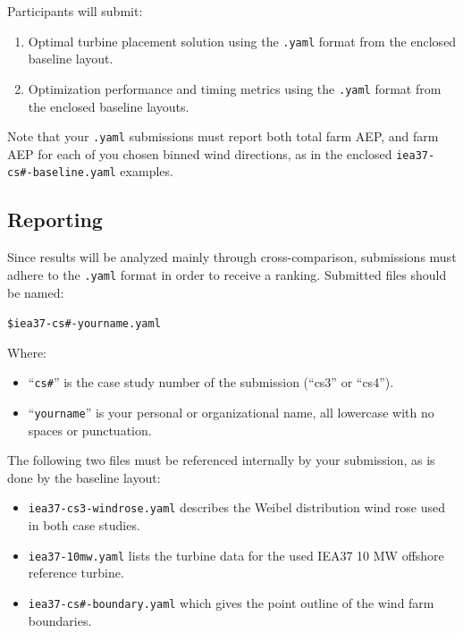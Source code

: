 \documentclass[10pt]{article}
\begin{document}
    Participants will submit:
    \begin{enumerate}
        \item Optimal turbine placement solution using the \texttt{.yaml} format from the enclosed baseline layout. 
        \item Optimization performance and timing metrics using the \texttt{.yaml} format from the enclosed baseline layouts.
    \end{enumerate}

    Note that your \texttt{.yaml} submissions must report both total farm AEP, and farm AEP for each of you chosen binned wind directions, as in the enclosed \texttt{iea37-cs\#-baseline.yaml} examples.

    \subsection{Reporting}

        Since results will be analyzed mainly through cross-comparison, submissions must adhere to the \texttt{.yaml} format in order to receive a ranking.
        Submitted files should be named:
        
        \vspace{0.5em}
        \texttt{\$iea37-cs\#-yourname.yaml}
        \vspace{0.5em}
        
        \noindent Where: 
        \begin{itemize}
            \item ``\texttt{cs\#}'' is the case study number of the submission (``cs3'' or ``cs4'').
            \item ``\texttt{yourname}'' is your personal or organizational name, all lowercase with no spaces or punctuation.
        \end{itemize}

        \noindent The following two files must be referenced internally by your submission, as is done by the baseline layout:
        \begin{itemize}
            \item \texttt{iea37-cs3-windrose.yaml} describes the Weibel distribution wind rose used in both case studies.
            \item \texttt{iea37-10mw.yaml} lists the turbine data for the used IEA37 10 MW offshore reference turbine.
            \item \texttt{iea37-cs\#-boundary.yaml} which gives the point outline of the wind farm boundaries.
        \end{itemize}
\end{document}
